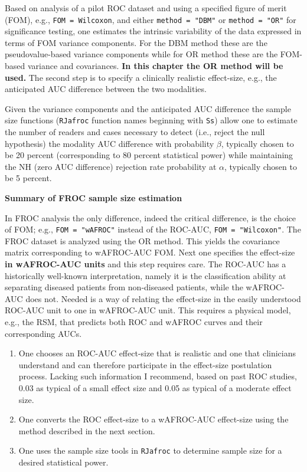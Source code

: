 \documentclass[
]{book}
\begin{document}
Based on analysis of a pilot ROC dataset and using a specified figure of merit (FOM), e.g., \texttt{FOM\ =\ Wilcoxon}, and either \texttt{method\ =\ "DBM"} or \texttt{method\ =\ "OR"} for significance testing, one estimates the intrinsic variability of the data expressed in terms of FOM variance components. For the DBM method these are the pseudovalue-based variance components while for OR method these are the FOM-based variance and covariances. \textbf{In this chapter the OR method will be used.} The second step is to specify a clinically realistic effect-size, e.g., the anticipated AUC difference between the two modalities.

Given the variance components and the anticipated AUC difference the sample size functions (\texttt{RJafroc} function names beginning with \texttt{Ss}) allow one to estimate the number of readers and cases necessary to detect (i.e., reject the null hypothesis) the modality AUC difference with probability \(\beta\), typically chosen to be 20 percent (corresponding to 80 percent statistical power) while maintaining the NH (zero AUC difference) rejection rate probability at \(\alpha\), typically chosen to be 5 percent.

\textbf{Summary of FROC sample size estimation}

In FROC analysis the only difference, indeed the critical difference, is the choice of FOM; e.g., \texttt{FOM\ =\ "wAFROC"} instead of the ROC-AUC, \texttt{FOM\ =\ "Wilcoxon"}. The FROC dataset is analyzed using the OR method. This yields the covariance matrix corresponding to wAFROC-AUC FOM. Next one specifies the effect-size \textbf{in wAFROC-AUC units} and this step requires care. The ROC-AUC has a historically well-known interpretation, namely it is the classification ability at separating diseased patients from non-diseased patients, while the wAFROC-AUC does not. Needed is a way of relating the effect-size in the easily understood ROC-AUC unit to one in wAFROC-AUC unit. This requires a physical model, e.g., the RSM, that predicts both ROC and wAFROC curves and their corresponding AUCs.

\begin{enumerate}
\def\labelenumi{\arabic{enumi}.}
\item
  One chooses an ROC-AUC effect-size that is realistic and one that clinicians understand and can therefore participate in the effect-size postulation process. Lacking such information I recommend, based on past ROC studies, 0.03 as typical of a small effect size and 0.05 as typical of a moderate effect size.
\item
  One converts the ROC effect-size to a wAFROC-AUC effect-size using the method described in the next section.
\item
  One uses the sample size tools in \texttt{RJafroc} to determine sample size for a desired statistical power.
\end{enumerate}
\end{document}
